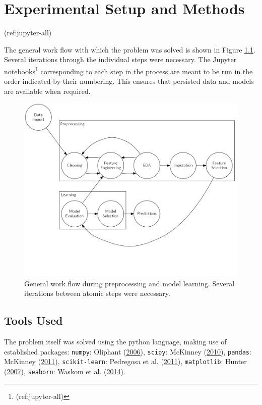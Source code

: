 \documentclass[
  11pt,
  a4paper,
  DIV=12,captions=tableheading,oneside,titlepage=firstiscover,abstracton]{scrreprt}
\begin{document}
\hypertarget{experimental-setup-and-methods}{%
\chapter{Experimental Setup and Methods}\label{experimental-setup-and-methods}}

(ref:jupyter-all)

The general work flow with which the problem was solved is shown in Figure \ref{fig:workflow}. Several iterations through the individual steps were necessary. The Jupyter notebooks\footnote{(ref:jupyter-all)} corresponding to each step in the process are meant to be run in the order indicated by their numbering. This ensures that persisted data and models are available when required.



\begin{figure}

{\centering \includegraphics[width=0.8\linewidth]{figures/preprocessing/workflow} 

}

\caption{General work flow during preprocessing and model learning. Several iterations between atomic steps were necessary.}\label{fig:workflow}
\end{figure}

\hypertarget{tools-used}{%
\section{Tools Used}\label{tools-used}}

The problem itself was solved using the python language, making use of established packages: \texttt{numpy}: Oliphant (\protect\hyperlink{ref-oliphant2006guide}{2006}), \texttt{scipy}: McKinney (\protect\hyperlink{ref-mckinney-proc-scipy-2010}{2010}), \texttt{pandas}: McKinney (\protect\hyperlink{ref-mckinney2011pandas}{2011}), \texttt{scikit-learn}: Pedregosa et al. (\protect\hyperlink{ref-scikit-learn}{2011}), \texttt{matplotlib}: Hunter (\protect\hyperlink{ref-hunter2007matplotlib}{2007}), \texttt{seaborn}: Waskom et al. (\protect\hyperlink{ref-waskom2014seaborn}{2014}).
\end{document}
